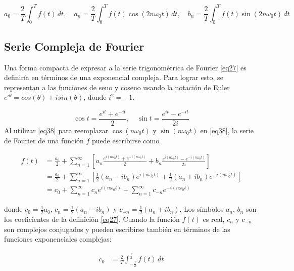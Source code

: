 \begin{equation}\label{eq37}
	a_0 = \frac{2}{T} \int_{0}^{T} f(t) \, dt, \quad a_n = \frac{2}{T} \int_{0}^{T} f(t) \cos(2n\omega_0 t) \, dt, \quad b_n = \frac{2}{T} \int_{0}^{T} f(t) \sin(2n\omega_0 t) \, dt
\end{equation}

\subsection{Serie Compleja de Fourier}
Una forma compacta de expresar a la serie trigonométrica de Fourier \eqref{eq27} es definiría en términos de una exponencial compleja. Para lograr esto, se representan a las funciones de seno y coseno usando la notación de Euler $e^{i\theta} = cos(\theta) + isin(\theta)$, donde $i^{2} = -1$. ~\cite{youtubeComplexFourier}

\begin{equation}\label{eq38}
	\cos t = \frac{e^{it} + e^{-it}}{2}, \quad \sin t = \frac{e^{it} - e^{-it}}{2i}
\end{equation}
Al utilizar \eqref{eq38} para reemplazar $\cos \left(n\omega_0 t\right)$ y $\sin \left(n\omega_0 t\right)$ en \eqref{eq38}, la serie de Fourier de una función $f$ puede escribirse como

\begin{equation} \label{eq39}
	\begin{split}
		f(t) &= \frac{a_0}{2} + \sum_{n=1}^{\infty} \left[a_n \frac{e^{i(n\omega_0 t)} + e^{-i(n\omega_0 t)}}{2} + b_n \frac{e^{i(n\omega_0 t)} - e^{-i(n\omega_0 t)}}{2i}\right] \\
		&= \frac{a_0}{2} + \sum_{n=1}^{\infty} \left[\frac{1}{2} \left(a_n - i b_n\right) e^{i (n\omega_0 t)} + \frac{1}{2} \left(a_n + i b_n\right) e^{-i (n\omega_0 t)}\right] \\
		&= c_0 + \sum_{n=1}^{\infty} c_n e^{i (n\omega_0 t)} + \sum_{n=1}^{\infty} c_{-n} e^{-i(n\omega_0 t)}
	\end{split}
\end{equation}


donde $c_0 = \frac{1}{2} a_0$, $c_n = \frac{1}{2} (a_n - i b_n)$ y $c_{-n} = \frac{1}{2} (a_n + i b_n)$. Los símbolos $a_n$, $b_n$ son los coeficientes de la definición \eqref{eq27}. Cuando la función $f(t)$ es real, $c_n$ y $c_{-n}$ son complejos conjugados y pueden escribirse también en términos de las funciones exponenciales complejas:

\begin{equation} \label{eq40}
	\begin{split}
		c_0 &= \frac{2}{T} \int_{-\frac{T}{2}}^{\frac{T}{2}} f(t) \, dt \\
	\end{split}
\end{equation}

